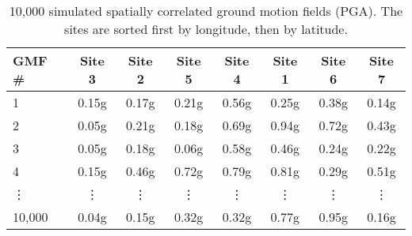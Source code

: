 \begin{table}[htbp]

\centering
\begin{tabular}{ l c c c c c c c }

\hline
\rowcolor{anti-flashwhite}
\bf{GMF \#} & \bf{Site 3} & \bf{Site 2} & \bf{Site 5} & \bf{Site 4} & \bf{Site 1} & \bf{Site 6} & \bf{Site 7}\\
\hline
1 & 0.15g & 0.17g & 0.21g & 0.56g & 0.25g & 0.38g & 0.14g \\
2 & 0.05g & 0.21g & 0.18g & 0.69g & 0.94g & 0.72g & 0.43g \\
3 & 0.05g & 0.18g & 0.06g & 0.58g & 0.46g & 0.24g & 0.22g \\
4 & 0.15g & 0.46g & 0.72g & 0.79g & 0.81g & 0.29g & 0.51g \\
\vdots & \vdots & \vdots & \vdots & \vdots & \vdots & \vdots & \vdots \\
10,000 & 0.04g & 0.15g & 0.32g & 0.32g & 0.77g & 0.95g & 0.16g \\
\hline
\end{tabular}

\caption{10,000 simulated spatially correlated ground motion fields (PGA). The sites are sorted first by longitude, then by latitude.}
\label{tab:gmfs-sim-l7-10000}
\end{table}
